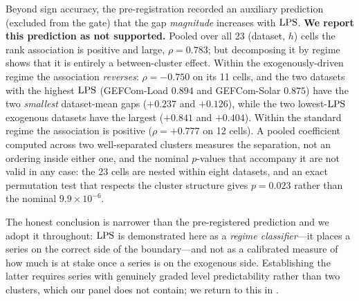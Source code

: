 Beyond sign accuracy, the pre-registration recorded an auxiliary prediction (excluded from the gate) that the gap \emph{magnitude} increases with $\mathrm{LPS}$. \textbf{We report this prediction as not supported.} Pooled over all 23 (dataset, $h$) cells the rank association is positive and large, $\rho=0.783$; but decomposing it by regime shows that it is entirely a between-cluster effect. Within the exogenously-driven regime the association \emph{reverses}: $\rho=-0.750$ on its 11 cells, and the two datasets with the highest $\mathrm{LPS}$ (GEFCom-Load $0.894$ and GEFCom-Solar $0.875$) have the two \emph{smallest} dataset-mean gaps ($+0.237$ and $+0.126$), while the two lowest-$\mathrm{LPS}$ exogenous datasets have the largest ($+0.841$ and $+0.404$). Within the standard regime the association is positive ($\rho=+0.777$ on 12 cells). A pooled coefficient computed across two well-separated clusters measures the separation, not an ordering inside either one, and the nominal $p$-values that accompany it are not valid in any case: the 23 cells are nested within eight datasets, and an exact permutation test that respects the cluster structure gives $p=0.023$ rather than the nominal $9.9\times10^{-6}$.

The honest conclusion is narrower than the pre-registered prediction and we adopt it throughout: $\mathrm{LPS}$ is demonstrated here as a \emph{regime classifier}---it places a series on the correct side of the boundary---and not as a calibrated measure of how much is at stake once a series is on the exogenous side. Establishing the latter requires series with genuinely graded level predictability rather than two clusters, which our panel does not contain; we return to this in .

